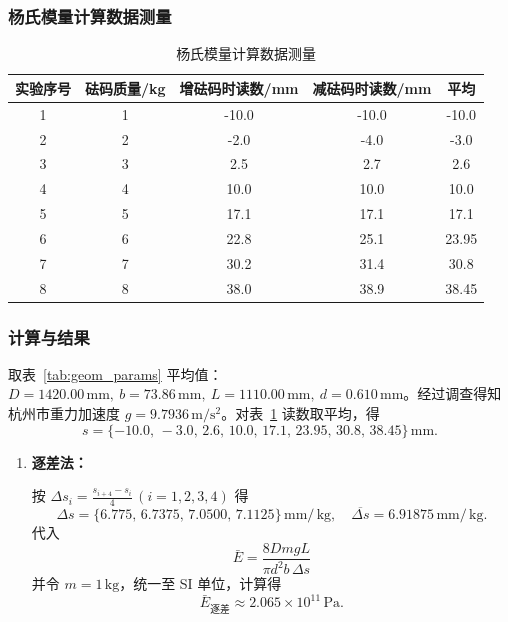 \documentclass[]{../../templates/Report}%
\begin{document}
\begin{fullreportonly}
    \subsubsection{杨氏模量计算数据测量}
    \begin{table}[H]
        \centering
        \caption{杨氏模量计算数据测量}
        \label{tab:load_readings}
        \small
        \begin{tabular}{|c|c|c|c|c|}
            \hline
            实验序号 & 砝码质量/kg & 增砝码时读数/mm & 减砝码时读数/mm & 平均    \\
            \hline
            1    & 1       & -10.0     & -10.0     & -10.0 \\
            2    & 2       & -2.0      & -4.0      & -3.0  \\
            3    & 3       & 2.5       & 2.7       & 2.6   \\
            4    & 4       & 10.0      & 10.0      & 10.0  \\
            5    & 5       & 17.1      & 17.1      & 17.1  \\
            6    & 6       & 22.8      & 25.1      & 23.95 \\
            7    & 7       & 30.2      & 31.4      & 30.8  \\
            8    & 8       & 38.0      & 38.9      & 38.45 \\
            \hline
        \end{tabular}
    \end{table}

    \subsubsection{计算与结果}
    取表~\ref{tab:geom_params} 平均值：\(D=1420.00\,\mathrm{mm},\ b=73.86\,\mathrm{mm},\ L=1110.00\,\mathrm{mm},\ d=0.610\,\mathrm{mm}\)。经过调查得知杭州市重力加速度 \(g=9.7936\,\mathrm{m/s^2}\)。对表~\ref{tab:load_readings} 读数取平均，得
    \[s=\{-10.0,\,-3.0,\,2.6,\,10.0,\,17.1,\,23.95,\,30.8,\,38.45\}\,\mathrm{mm} .\]

    \begin{enumerate}[label=(\arabic*)]
        \item \textbf{逐差法：}

              按 \(\Delta s_i=\frac{s_{i+4}-s_i}{4}\,(i=1,2,3,4)\) 得
              \[\Delta s=\{6.775,\,6.7375,\,7.0500,\,7.1125\}\,\mathrm{mm/\,kg},\quad \overline{\Delta s}=6.91875\,\mathrm{mm/\,kg}.\]
              代入
              \[\bar{E}=\frac{8DmgL}{\pi d^2 b\,\Delta s}\]
              并令 \(m=1\,\mathrm{kg}\)，统一至 SI 单位，计算得
              \[\boxed{\bar{E}_{\text{逐差}}\approx 2.065\times10^{11}\,\mathrm{Pa} }.\]


\end{enumerate}
\end{fullreportonly}
\end{document}
